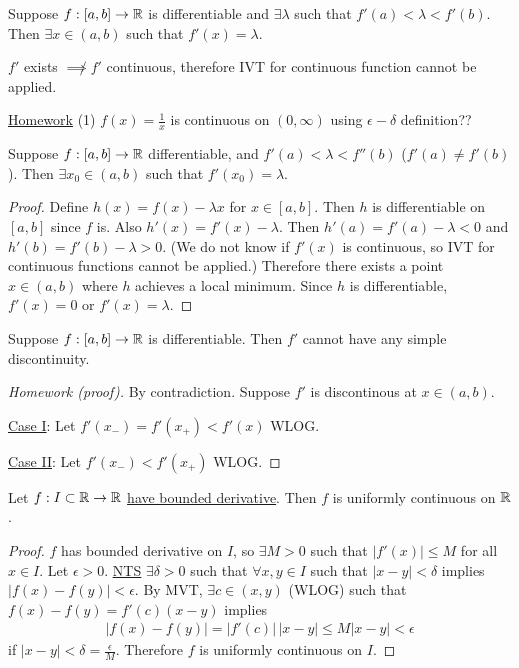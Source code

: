 \documentclass[]{article}
\begin{document}
\begin{theorem}
	\label{thm-5-12}
	Suppose $f:[a,b]\rightarrow\mathbb{R}$ is differentiable and $\exists\lambda$ such that $f'(a)<\lambda<f'(b)$.
	Then $\exists x\in(a,b)$ such that $f'(x)=\lambda$.
\end{theorem}
\begin{note}
	$f'$ exists $\not\implies f'$ continuous, therefore IVT for continuous function cannot be applied.
\end{note}

\ul{Homework} (1) $f(x) = \frac1x$ is continuous on $(0,\infty)$ using $\epsilon-\delta$ definition??

\begin{recall}
	Suppose $f:[a,b]\rightarrow\mathbb{R}$ differentiable, and $f'(a)<\lambda<f''(b)$ ($f'(a)\neq f'(b)$). Then $\exists x_0\in(a,b)$ such that $f'(x_0) = \lambda$.
\end{recall}
\begin{proof}
	Define $h(x) = f(x)-\lambda x$ for $x\in[a,b]$.
	Then $h$ is differentiable on $[a,b]$ since $f$ is. Also $h'(x) = f'(x)-\lambda$.
	Then $h'(a) = f'(a)-\lambda<0$ and $h'(b)=f'(b) - \lambda >0$.
	(We do not know if $f'(x)$ is continuous, so IVT for continuous functions cannot be applied.)
	Therefore there exists a point $x\in(a,b)$ where $h$ achieves a local minimum.
	Since $h$ is differentiable, $f'(x)=0$ or $f'(x) = \lambda$.
\end{proof}
\begin{corollary}
	Suppose $f:[a,b]\rightarrow\mathbb{R}$ is differentiable. Then $f'$ cannot have any simple discontinuity.
\end{corollary}
\begin{proof}
	[Homework (proof)]
	By contradiction. Suppose $f'$ is discontinous at $x\in(a,b)$.

	\ul{Case I}: Let $f'(x_-) = f'(x_+) < f'(x)$ WLOG.

	\ul{Case II}: Let $f'(x_-)<f'(x_+)$ WLOG.
\end{proof}
\begin{corollary}
	Let $f:I\subset\mathbb{R}\rightarrow\mathbb{R}$ \ul{have bounded derivative}. Then $f$ is uniformly continuous on $\mathbb{R}$.
\end{corollary}
\begin{proof}
	$f$ has bounded derivative on $I$, so  $\exists M>0$ such that $|f'(x)|\leq M$ for all $x\in I$.
	Let $\epsilon>0$. \ul{\ul{NTS}} $\exists\delta>0$ such that $\forall x,y\in I$ such that $|x-y|<\delta$ implies $|f(x)-f(y)|<\epsilon$.
	By MVT, $\exists c\in(x,y)$ (WLOG) such that $f(x)-f(y) = f'(c)(x-y)$ implies
	\begin{align*}
		|f(x)-f(y)| = |f'(c)|\,|x-y|
					\leq M|x-y|
					< \epsilon
	\end{align*}
	if $|x-y|<\delta=\frac\epsilon M$.
	Therefore $f$ is uniformly continuous on $I$.
\end{proof}
\end{document}
